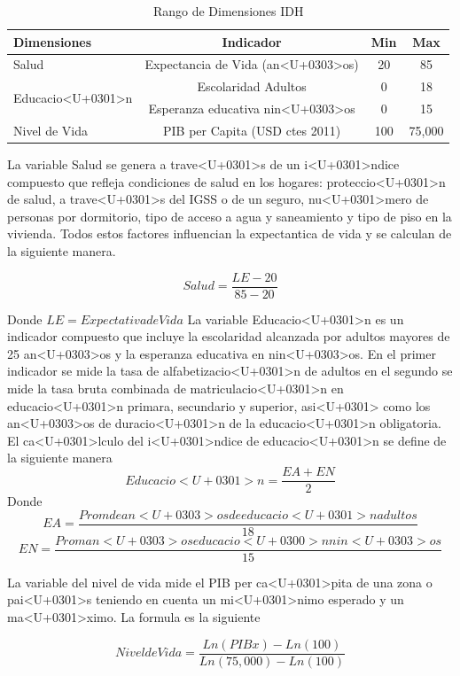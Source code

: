 \documentclass{article}
\begin{document}

\begin{table}[h!]
\centering
  \begin{tabular}{l c c c}
  \hline
  Dimensiones & Indicador & Min & Max \\ [0.25ex]
  \hline \hline
  Salud & Expectancia de Vida (an<U+0303>os) & 20 & 85 \\
  \multirow{2}{*}{Educacio<U+0301>n} & Escolaridad Adultos & 0 & 18 \\ 
   & Esperanza educativa nin<U+0303>os & 0 & 15 \\
  Nivel de Vida  & PIB per Capita (USD ctes 2011) & 100 & 75,000 \\
  \hline
  \end{tabular}
 \caption {Rango de Dimensiones IDH}
  \label{Tabla 1:}
\end {table}  

La variable Salud se genera a trave<U+0301>s de un i<U+0301>ndice compuesto que refleja condiciones de salud en los hogares: proteccio<U+0301>n de salud, a trave<U+0301>s del IGSS o de un seguro, nu<U+0301>mero de personas por dormitorio, tipo de acceso a agua y saneamiento y tipo de piso en la vivienda. Todos estos factores influencian la expectantica de vida y se calculan de la siguiente manera.

\[ Salud=\frac{LE-20} {85-20} \]

Donde $LE = Expectativa de Vida$
La variable Educacio<U+0301>n es un indicador compuesto que incluye la escolaridad alcanzada por adultos mayores de 25 an<U+0303>os y la esperanza educativa en nin<U+0303>os. En el primer indicador se mide la tasa de alfabetizacio<U+0301>n de adultos en el segundo se mide la tasa bruta combinada de matriculacio<U+0301>n en educacio<U+0301>n primara, secundario y superior, asi<U+0301> como los an<U+0303>os de duracio<U+0301>n de la educacio<U+0301>n obligatoria. El ca<U+0301>lculo del i<U+0301>ndice de educacio<U+0301>n se define de la siguiente manera
\[Educacio<U+0301>n= \frac{EA + EN} {2} \]
Donde
\[EA= \frac{Prom de an<U+0303>os de educacio<U+0301>n adultos} {18}  \]
\[EN= \frac{Prom an<U+0303>os educacio<U+0300>n nin<U+0303>os} {15}  \]

La variable del nivel de vida mide el PIB per ca<U+0301>pita de una zona o pai<U+0301>s teniendo en cuenta un mi<U+0301>nimo esperado y un ma<U+0301>ximo. La formula es la siguiente

\[Nivel de Vida = \frac {Ln(PIBx)-Ln(100)} {Ln(75,000)-Ln(100)} \]
\end{document}
